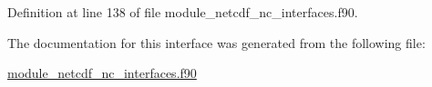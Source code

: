 Definition at line 138 of file module\+\_\+netcdf\+\_\+nc\+\_\+interfaces.\+f90.



The documentation for this interface was generated from the following file\+:\begin{DoxyCompactItemize}
\item 
\hyperlink{module__netcdf__nc__interfaces_8f90}{module\+\_\+netcdf\+\_\+nc\+\_\+interfaces.\+f90}\end{DoxyCompactItemize}
